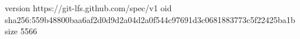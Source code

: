 version https://git-lfs.github.com/spec/v1
oid sha256:559b48800baa6af2d0d9d2a04d2a0f544c97691d3c0681883773c5f22425ba1b
size 5566
